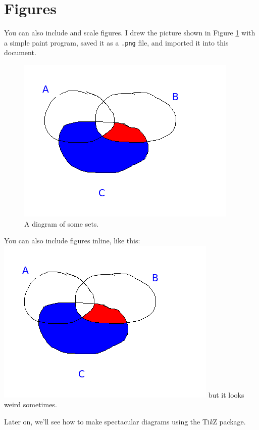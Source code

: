 \documentclass{article}
\newcommand{\TikZ}{Ti\textit{k}Z\xspace}
\begin{document}
\section{Figures}

You can also include and scale figures.
I drew the picture shown in Figure \ref{setfigure}
with a simple paint program, saved it as a {\tt .png}
file, and imported it into this document.


\begin{figure}
  \begin{center}
    \includegraphics[scale=0.5]{sets.png}
    \caption{A diagram of some sets.}
    \label{setfigure}
  \end{center}
\end{figure}

You can also include figures inline, like this:
\includegraphics[scale=0.25]{sets.png} but it looks weird sometimes.

Later on, we'll see how to make spectacular diagrams using the \TikZ
package. 
\end{document}
